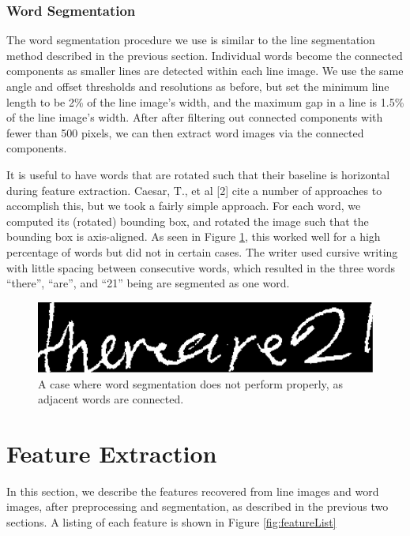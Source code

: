 \documentclass[paper=a4, fontsize=11pt]{scrartcl} %
\numberwithin{equation}{section} %
\numberwithin{figure}{section} %
\numberwithin{table}{section} %
\begin{document}
\subsubsection{Word Segmentation}
The word segmentation procedure we use is similar to the line
segmentation method described in the previous section. Individual words become the connected components as smaller lines are detected within each line image. We use the same angle and offset thresholds and resolutions as before, but set the minimum line length  to be 2\% of the line image's width,
and the maximum gap in a line is 1.5\% of the line image's
width. After after filtering out connected components with fewer than
500 pixels, we can then extract word images via the connected
components.

It is useful to have words that are rotated such that their baseline
is horizontal during feature extraction. Caesar, T., et al [2] cite a
number of approaches to accomplish this, but we took a fairly simple
approach. For each word, we computed its (rotated) bounding box, and
rotated the image such that the bounding box is axis-aligned. As seen
in Figure \ref{fig:wordfail}, this worked well for a high percentage
of words but did not in certain cases. The writer used cursive writing
with little spacing between consecutive words, which resulted in the
three words “there”, “are”, and “21” being are segmented as one word.

\begin{figure}
  \centering \includegraphics{wordfail.png}
  \caption{A case where word segmentation does not perform properly,
    as adjacent words are connected.}
  \label{fig:wordfail}
\end{figure}


\section{Feature Extraction}
\label{sec:feature}
In this section, we describe the features recovered from line images
and word images, after preprocessing and segmentation, as described in
the previous two sections. A listing of each feature is shown in
Figure \ref{fig:featureList}
\end{document}
